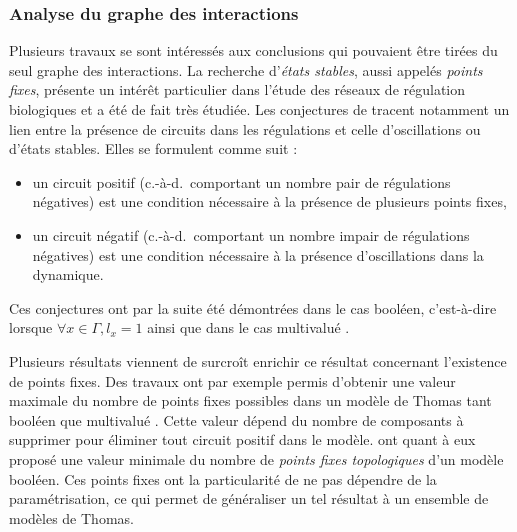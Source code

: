 \subsubsection*{Analyse du graphe des interactions}
Plusieurs travaux se sont intéressés aux conclusions qui pouvaient être
tirées du seul graphe des interactions.
La recherche d'\emph{états stables}, aussi appelés \emph{points fixes},
présente un intérêt particulier dans l'étude des réseaux de régulation biologiques
et a été de fait très étudiée.
Les conjectures de 
tracent notamment un lien entre la présence de circuits dans les régulations et celle
d'oscillations ou d'états stables.
Elles se formulent comme suit :
\begin{itemize}
  \item un circuit positif (c.-à-d.~comportant un nombre pair de régulations négatives)
    est une condition nécessaire à la présence de plusieurs points fixes,
  \item un circuit négatif (c.-à-d.~comportant un nombre impair de régulations négatives)
    est une condition nécessaire à la présence d'oscillations dans la dynamique.
\end{itemize}
Ces conjectures ont par la suite été démontrées
dans le cas booléen, c'est-à-dire lorsque $\forall x \in \Gamma, l_x = 1$
\cite{RRT08,Richard06thesis}
ainsi que dans le cas multivalué \cite{RiCo07,Richard10}.

Plusieurs résultats viennent de surcroît enrichir ce résultat concernant
l'existence de points fixes.
Des travaux ont par exemple
permis d'obtenir une valeur maximale du nombre de points fixes possibles
dans un modèle de Thomas tant booléen \cite{aracena2008maximum} que multivalué \cite{Richard09}.
Cette valeur dépend du nombre de composants à supprimer pour éliminer
tout circuit positif dans le modèle.
 ont quant à eux proposé une valeur minimale du nombre de
\emph{points fixes topologiques} d'un modèle booléen.
Ces points fixes ont la particularité de ne pas dépendre de la paramétrisation,
ce qui permet de généraliser un tel résultat à un ensemble de modèles de Thomas.

